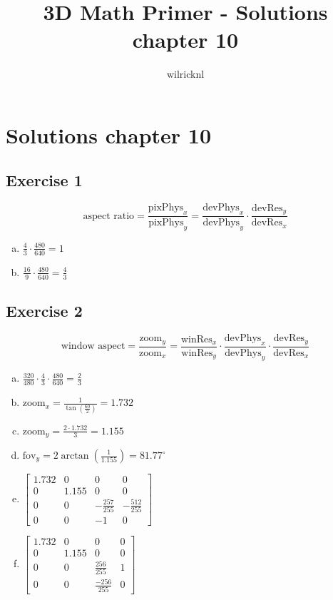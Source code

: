 \documentclass[11pt]{article}
\author{wilricknl}
\title{3D Math Primer - Solutions chapter 10}
\begin{document}
\maketitle

\section{Solutions chapter 10}

\subsection{Exercise 1}

$$\text{aspect ratio} = \frac{\text{pixPhys}_x}{\text{pixPhys}_y} = \frac{\text{devPhys}_x}{\text{devPhys}_y} \cdot \frac{\text{devRes}_y}{\text{devRes}_x}$$

\begin{enumerate}[a.]
	\item $\frac{4}{3} \cdot \frac{480}{640} = 1$
	\item $\frac{16}{9} \cdot \frac{480}{640} = \frac{4}{3}$
\end{enumerate}

\subsection{Exercise 2}

$$\text{window aspect} = \frac{\text{zoom}_y}{\text{zoom}_x} = \frac{\text{winRes}_x}{\text{winRes}_y} \cdot\frac{\text{devPhys}_x}{\text{devPhys}_y} \cdot \frac{\text{devRes}_y}{\text{devRes}_x}$$

\begin{enumerate}[a.]
	\item $\frac{320}{480} \cdot \frac{4}{3} \cdot \frac{480}{640} = \frac{2}{3}$
	\item $\text{zoom}_x = \frac{1}{\tan(\frac{60}{2})} = 1.732$
	\item $\text{zoom}_y = \frac{2 \cdot 1.732}{3} = 1.155$
	\item $\text{fov}_y = 2 \arctan(\frac{1}{1.155}) = 81.77^{\circ}$
	\item $\begin{bmatrix}
		1.732 & 0 & 0 & 0 \\
		0 & 1.155 & 0 & 0 \\
		0 & 0 & -\frac{257}{255} & -\frac{512}{255} \\
		0 & 0 & -1 & 0
	\end{bmatrix}$
	\item $\begin{bmatrix}
		1.732 & 0 & 0 & 0 \\
		0 & 1.155 & 0 & 0 \\
		0 & 0 & \frac{256}{255} & 1 \\
		0 & 0 & \frac{-256}{255} & 0
	\end{bmatrix}$
\end{enumerate}
\end{document}
